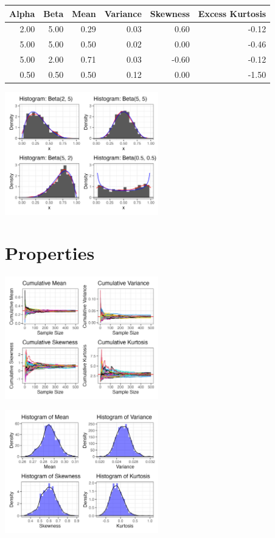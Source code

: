 \documentclass{article}\usepackage[]{graphicx}\usepackage[]{xcolor}
\newenvironment{Figure}
  {\par\medskip\noindent\minipage{\linewidth}}
  {\endminipage\par\medskip}
\begin{document}
\begin{multicols}{2}
\begin{Figure}
\centering
\begin{tabular}{rrrrrr}
  \hline
 Alpha & Beta & Mean & Variance & Skewness & Excess Kurtosis \\ 
  \hline
2.00 & 5.00 & 0.29 & 0.03 & 0.60 & -0.12 \\ 
5.00 & 5.00 & 0.50 & 0.02 & 0.00 & -0.46 \\ 
5.00 & 2.00 & 0.71 & 0.03 & -0.60 & -0.12 \\ 
0.50 & 0.50 & 0.50 & 0.12 & 0.00 & -1.50 \\ 
   \hline
\end{tabular}
\end{Figure}

\begin{center}
  \includegraphics[width=0.5\textwidth]{task3.png}
\end{center} 

\section{Properties}

\begin{center}
  \includegraphics[width=0.5\textwidth]{task4.png}
\end{center} 

\begin{center}
  \includegraphics[width=0.5\textwidth]{task5.png}
\end{center} 


\end{multicols}
\end{document}
